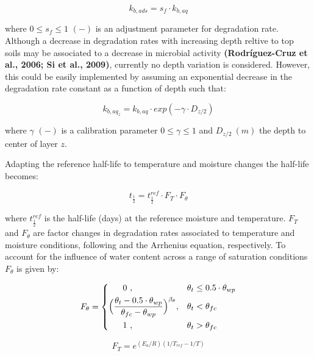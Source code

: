 \documentclass[]{article}
\begin{document}
\begin{equation}
k_{b,ads} = s_f \cdot k_{b,aq}   
\label{eq:k_bads}
\end{equation}

where \(0 \leq s_f \leq 1\) \((-)\) is an adjustment parameter for
degradation rate. Although a decrease in degradation rates with
increasing depth reltive to top soils may be associated to a decrease in
microbial activity \textbf{(Rodríguez-Cruz et al., 2006; Si et al.,
2009)}, currently no depth variation is considered. However, this could
be easily implemented by assuming an exponential decrease in the
degradation rate constant as a function of depth such that:

\begin{equation}
k_{{b,aq}_z} = k_{b,aq}\cdot exp(-\gamma \cdot D_{z/2}) 
\label{eq:gamma}
\end{equation}

where \(\gamma\) \((-)\) is a calibration parameter
\(0 \leq \gamma \leq 1\) and \(D_{z/2}~(m)\) the depth to center of
layer \(z\).

Adapting the reference half-life to temperature and moisture changes the
half-life becomes:

\begin{equation}
t_\frac{1}{2}=t_\frac{1}{2}^{ref}\cdot F_T \cdot F_\theta
\label{eq:DT50} 
\end{equation}

where \(t_\frac{1}{2}^{ref}\) is the half-life (days) at the reference
moisture and temperature. \(F_T\) and \(F_\theta\) are factor changes in
degradation rates associated to temperature and moisture conditions,
following \cite{Schroll2006} and the Arrhenius equation, respectively.
To account for the influence of water content across a range of
saturation conditions \(F_\theta\) is given by:

\begin{equation} 
    F_\theta = 
\begin{dcases}
     ~~~~~0~,                 & \theta_t \leq 0.5 \cdot \theta_{wp} \\
    \Big(\frac{ \theta_t- 0.5 \cdot \theta_{wp} } { \theta_{fc} - \theta_{wp} }\Big)^{\beta_{\theta} },    & \theta_t <  \theta_{fc} \\
     ~~~~~1~,                 & \theta_t > \theta_{fc} 
\end{dcases}
\end{equation}

\begin{equation} 
F_T = e^{(E_a/R)(1/T_{ref} - 1/T)}
\end{equation}
\end{document}
